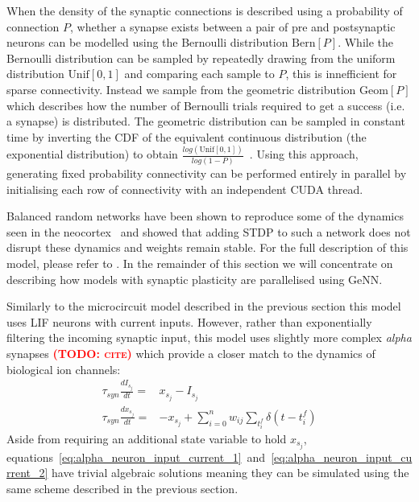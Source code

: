 \documentclass[utf8]{frontiersSCNS} %
\newcommand{\todo}[1]{\textbf{\textsc{\textcolor{red}{(TODO: #1)}}}}
\begin{document}
When the density of the synaptic connections is described using a probability of connection $P$, whether a synapse exists between a pair of pre and postsynaptic neurons can be modelled using the Bernoulli distribution $\text{Bern}[P]$.
While the Bernoulli distribution can be sampled by repeatedly drawing from the uniform distribution $\text{Unif}[0, 1]$ and comparing each sample to $P$, this is innefficient for sparse connectivity.
Instead we sample from the geometric distribution $\text{Geom}[P]$ which describes how the number of Bernoulli trials required to get a success (i.e. a synapse) is distributed.
The geometric distribution can be sampled in constant time by inverting the CDF of the equivalent continuous distribution (the exponential distribution) to obtain $\frac{log(\text{Unif}[0, 1])}{log(1 - P)}$~\citep{DevroyeLuc2013}.
Using this approach, generating fixed probability connectivity can be performed entirely in parallel by initialising each row of connectivity with an independent CUDA thread.

Balanced random networks have been shown to reproduce some of the dynamics seen in the neocortex~\citep{Brunel1999,Brunel2000} and \citeauthor{Morrison2007} showed that adding STDP to such a network does not disrupt these dynamics and weights remain stable.
For the full description of this model, please refer to \citeauthor{Morrison2007}.
In the remainder of this section we will concentrate on describing how models with synaptic plasticity are parallelised using GeNN.

Similarly to the microcircuit model described in the previous section this model uses LIF neurons with current inputs.
However, rather than exponentially filtering the incoming synaptic input, this model uses slightly more complex \textit{alpha} synapses \todo{cite} which provide a closer match to the dynamics of biological ion channels:
%
\begin{align}
    \tau_{syn} \frac{dI_{s_{j}}}{dt} = & x_{s_{j}} - I_{s_{j}} \label{eq:alpha_neuron_input_current_1}\\ 
    \tau_{syn} \frac{dx_{s_{j}}}{dt} = & -x_{s_{j}} + \sum_{i=0}^{n} w_{ij} \sum_{t_{i}^{f}}  \delta(t - t_{i}^{f}) \label{eq:alpha_neuron_input_current_2}
\end{align}
%
Aside from requiring an additional state variable to hold $x_{s_{j}}$, equations~\ref{eq:alpha_neuron_input_current_1}~and~\ref{eq:alpha_neuron_input_current_2} have trivial algebraic solutions meaning they can be simulated using the same scheme described in the previous section.
\end{document}
